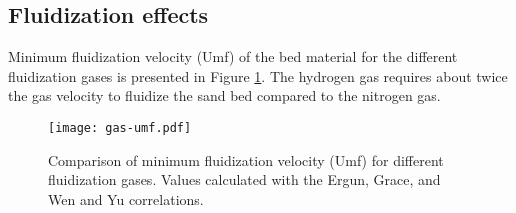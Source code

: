 \subsection{Fluidization effects}

Minimum fluidization velocity (Umf) of the bed material for the different fluidization gases is presented in Figure \ref{fig:gas-umf}. The hydrogen gas requires about twice the gas velocity to fluidize the sand bed compared to the nitrogen gas.

\begin{figure}[H]
    \centering
    \texttt{[image: gas-umf.pdf]}
    \caption{Comparison of minimum fluidization velocity (Umf) for different fluidization gases. Values calculated with the Ergun, Grace, and Wen and Yu correlations.}
    \label{fig:gas-umf}
\end{figure}
